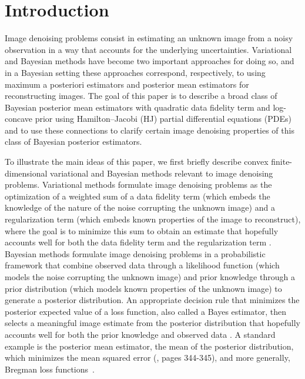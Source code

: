 

\section{Introduction} \label{sec:intro}
Image denoising problems consist in estimating an unknown image from a noisy observation in a way that accounts for the underlying uncertainties. Variational and Bayesian methods have become two important approaches for doing so, and in a Bayesian setting these approaches correspond, respectively, to using maximum a posteriori estimators and posterior mean estimators for reconstructing images. The goal of this paper is to describe a broad class of Bayesian posterior mean estimators with quadratic data fidelity term and log-concave prior using Hamilton--Jacobi (HJ) partial differential equations (PDEs) and to use these connections to clarify certain image denoising properties of this class of Bayesian posterior estimators.

To illustrate the main ideas of this paper, we first briefly describe convex finite-dimensional variational and Bayesian methods relevant to image denoising problems. Variational methods formulate image denoising problems as the optimization of a weighted sum of a data fidelity term (which embeds the knowledge of the nature of the noise corrupting the unknown image) and a regularization term (which embeds known properties of the image to reconstruct), where the goal is to minimize this sum to obtain an estimate that hopefully accounts well for both the data fidelity term and the regularization term \cite{chambolle2016introduction,darbon2015convex}. Bayesian methods formulate image denoising problems in a probabilistic framework that combine observed data through a likelihood function (which models the noise corrupting the unknown image) and prior knowledge through a prior distribution (which models known properties of the unknown image) to generate a posterior distribution. An appropriate decision rule that minimizes the posterior expected value of a loss function, also called a Bayes estimator, then selects a meaningful image estimate from the posterior distribution that hopefully accounts well for both the prior knowledge and observed data \cite{demoment1989image,stuart2010inverse,tarantola2005inverse,tikhonov1995numerical,vogel2002computational}. A standard example is the posterior mean estimator, the mean of the posterior distribution, which minimizes the mean squared error (\cite{kay1993fundamentals}, pages 344-345), and more generally, Bregman loss functions~\cite{banerjee2005optimality}.

